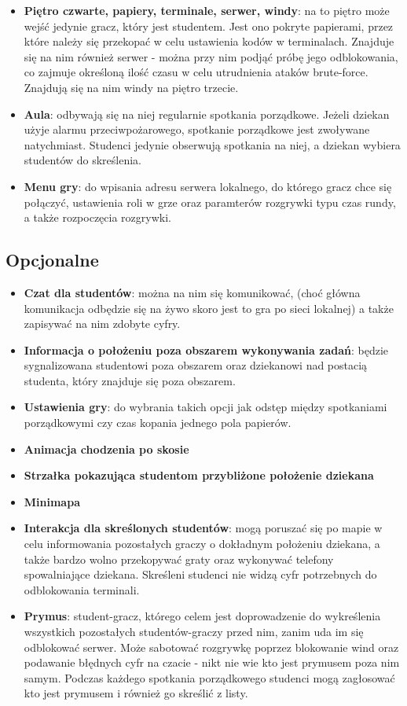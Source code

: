 \documentclass[]{report}
\begin{document}
\begin{itemize}
	\item \textbf{Piętro czwarte, papiery, terminale, serwer, windy}: na to piętro może wejść jedynie gracz, który jest studentem. Jest ono pokryte papierami, przez które należy się przekopać w celu ustawienia kodów w terminalach. Znajduje się na nim również serwer - można przy nim podjąć próbę jego odblokowania, co zajmuje określoną ilość czasu w celu utrudnienia ataków brute-force. Znajdują się na nim windy na piętro trzecie.
	\item \textbf{Aula}: odbywają się na niej regularnie spotkania porządkowe. Jeżeli dziekan użyje alarmu przeciwpożarowego, spotkanie porządkowe jest zwoływane natychmiast. Studenci jedynie obserwują spotkania na niej, a dziekan wybiera studentów do skreślenia.
	\item \textbf{Menu gry}: do wpisania adresu serwera lokalnego, do którego gracz chce się połączyć, ustawienia roli w grze oraz paramterów rozgrywki typu czas rundy, a także rozpoczęcia rozgrywki.
\end{itemize}
\subsection{Opcjonalne}
\begin{itemize}
	\item \textbf{Czat dla studentów}: można na nim się komunikować, (choć główna komunikacja odbędzie się na żywo skoro jest to gra po sieci lokalnej) a także zapisywać na nim zdobyte cyfry.
	\item \textbf{Informacja o położeniu poza obszarem wykonywania zadań}: będzie sygnalizowana studentowi poza obszarem oraz dziekanowi nad postacią studenta, który znajduje się poza obszarem.
	\item \textbf{Ustawienia gry}: do wybrania takich opcji jak odstęp między spotkaniami porządkowymi czy czas kopania jednego pola papierów.
	\item \textbf{Animacja chodzenia po skosie}
	\item \textbf{Strzałka pokazująca studentom przybliżone położenie dziekana}
	\item \textbf{Minimapa}
	\item \textbf{Interakcja dla skreślonych studentów}: mogą poruszać się po mapie w celu informowania pozostałych graczy o dokładnym położeniu dziekana, a także bardzo wolno przekopywać graty oraz wykonywać telefony spowalniające dziekana. Skreśleni studenci nie widzą cyfr potrzebnych do odblokowania terminali.
	\item \textbf{Prymus}: student-gracz, którego celem jest doprowadzenie do wykreślenia wszystkich pozostałych studentów-graczy przed nim, zanim uda im się odblokować serwer. Może sabotować rozgrywkę poprzez blokowanie wind oraz podawanie błędnych cyfr na czacie - nikt nie wie kto jest prymusem poza nim samym. Podczas każdego spotkania porządkowego studenci mogą zagłosować kto jest prymusem i również go skreślić z listy.
\end{itemize}
\end{document}
